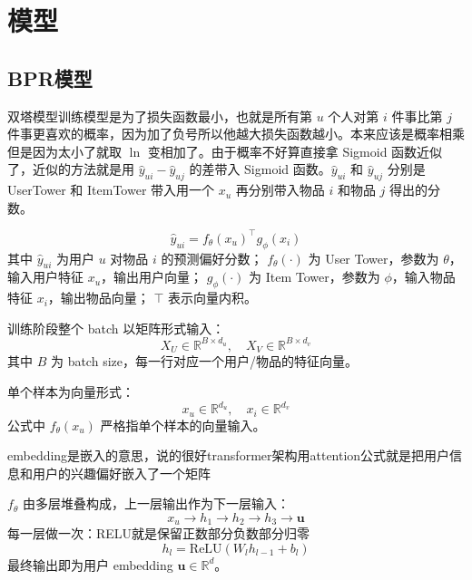 \chapter{模型}
\section{BPR模型}
\begin{dxtips}
   
双塔模型训练模型是为了损失函数最小，也就是所有第 $u$ 个人对第 $i$ 件事比第 $j$ 件事更喜欢的概率，因为加了负号所以他越大损失函数越小。本来应该是概率相乘但是因为太小了就取 $\ln$ 变相加了。由于概率不好算直接拿 Sigmoid 函数近似了，近似的方法就是用 $\hat{y}_{ui} - \hat{y}_{uj}$ 的差带入 Sigmoid 函数。$\hat{y}_{ui}$ 和 $\hat{y}_{uj}$ 分别是 UserTower 和 ItemTower 带入用一个 $x_u$ 再分别带入物品 $i$ 和物品 $j$ 得出的分数。

\end{dxtips}
\begin{definition}[模型打分]
$$
\hat{y}_{ui} = f_\theta(x_u)^\top g_\phi(x_i)
$$
其中 $\hat{y}_{ui}$ 为用户 $u$ 对物品 $i$ 的预测偏好分数；
$f_\theta(\cdot)$ 为 User Tower，参数为 $\theta$，输入用户特征 $x_u$，输出用户向量；
$g_\phi(\cdot)$ 为 Item Tower，参数为 $\phi$，输入物品特征 $x_i$，输出物品向量；
$\top$ 表示向量内积。
\end{definition}
\begin{note}
训练阶段整个 batch 以矩阵形式输入：
$$
X_U \in \mathbb{R}^{B \times d_u}, \quad X_V \in \mathbb{R}^{B \times d_v}
$$
其中 $B$ 为 batch size，每一行对应一个用户/物品的特征向量。

单个样本为向量形式：
$$
x_u \in \mathbb{R}^{d_u}, \quad x_i \in \mathbb{R}^{d_v}
$$
公式中 $f_\theta(x_u)$ 严格指单个样本的向量输入。
\end{note}
\begin{note}
    embedding是嵌入的意思，说的很好transformer架构用attention公式就是把用户信息和用户的兴趣偏好嵌入了一个矩阵
\end{note}
\begin{note}
$f_\theta$ 由多层堆叠构成，上一层输出作为下一层输入：
$$
x_u \to h_1 \to h_2 \to h_3 \to \mathbf{u}
$$
每一层做一次：RELU就是保留正数部分负数部分归零
$$
h_l = \text{ReLU}(W_l h_{l-1} + b_l)
$$
最终输出即为用户 embedding $\mathbf{u} \in \mathbb{R}^d$。
\end{note}

